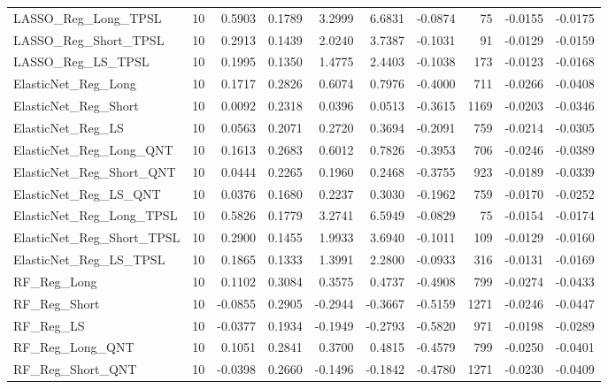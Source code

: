 \begin{tabular}{llrrrrrrrr}
\cline{1-10}
LASSO\_Reg\_Long\_TPSL & 10 & 0.5903 & 0.1789 & 3.2999 & 6.6831 & -0.0874 & 75 & -0.0155 & -0.0175 \\
\cline{1-10}
LASSO\_Reg\_Short\_TPSL & 10 & 0.2913 & 0.1439 & 2.0240 & 3.7387 & -0.1031 & 91 & -0.0129 & -0.0159 \\
\cline{1-10}
LASSO\_Reg\_LS\_TPSL & 10 & 0.1995 & 0.1350 & 1.4775 & 2.4403 & -0.1038 & 173 & -0.0123 & -0.0168 \\
\cline{1-10}
ElasticNet\_Reg\_Long & 10 & 0.1717 & 0.2826 & 0.6074 & 0.7976 & -0.4000 & 711 & -0.0266 & -0.0408 \\
\cline{1-10}
ElasticNet\_Reg\_Short & 10 & 0.0092 & 0.2318 & 0.0396 & 0.0513 & -0.3615 & 1169 & -0.0203 & -0.0346 \\
\cline{1-10}
ElasticNet\_Reg\_LS & 10 & 0.0563 & 0.2071 & 0.2720 & 0.3694 & -0.2091 & 759 & -0.0214 & -0.0305 \\
\cline{1-10}
ElasticNet\_Reg\_Long\_QNT & 10 & 0.1613 & 0.2683 & 0.6012 & 0.7826 & -0.3953 & 706 & -0.0246 & -0.0389 \\
\cline{1-10}
ElasticNet\_Reg\_Short\_QNT & 10 & 0.0444 & 0.2265 & 0.1960 & 0.2468 & -0.3755 & 923 & -0.0189 & -0.0339 \\
\cline{1-10}
ElasticNet\_Reg\_LS\_QNT & 10 & 0.0376 & 0.1680 & 0.2237 & 0.3030 & -0.1962 & 759 & -0.0170 & -0.0252 \\
\cline{1-10}
ElasticNet\_Reg\_Long\_TPSL & 10 & 0.5826 & 0.1779 & 3.2741 & 6.5949 & -0.0829 & 75 & -0.0154 & -0.0174 \\
\cline{1-10}
ElasticNet\_Reg\_Short\_TPSL & 10 & 0.2900 & 0.1455 & 1.9933 & 3.6940 & -0.1011 & 109 & -0.0129 & -0.0160 \\
\cline{1-10}
ElasticNet\_Reg\_LS\_TPSL & 10 & 0.1865 & 0.1333 & 1.3991 & 2.2800 & -0.0933 & 316 & -0.0131 & -0.0169 \\
\cline{1-10}
RF\_Reg\_Long & 10 & 0.1102 & 0.3084 & 0.3575 & 0.4737 & -0.4908 & 799 & -0.0274 & -0.0433 \\
\cline{1-10}
RF\_Reg\_Short & 10 & -0.0855 & 0.2905 & -0.2944 & -0.3667 & -0.5159 & 1271 & -0.0246 & -0.0447 \\
\cline{1-10}
RF\_Reg\_LS & 10 & -0.0377 & 0.1934 & -0.1949 & -0.2793 & -0.5820 & 971 & -0.0198 & -0.0289 \\
\cline{1-10}
RF\_Reg\_Long\_QNT & 10 & 0.1051 & 0.2841 & 0.3700 & 0.4815 & -0.4579 & 799 & -0.0250 & -0.0401 \\
\cline{1-10}
RF\_Reg\_Short\_QNT & 10 & -0.0398 & 0.2660 & -0.1496 & -0.1842 & -0.4780 & 1271 & -0.0230 & -0.0409 \\

\end{tabular}
